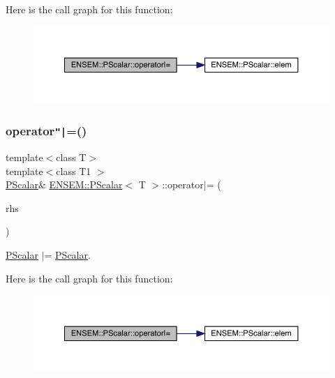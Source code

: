 Here is the call graph for this function\+:
\nopagebreak
\begin{figure}[H]
\begin{center}
\leavevmode
\includegraphics[width=350pt]{d3/d27/classENSEM_1_1PScalar_a59ee3adbb8dabcfb25aae9f9390dcef0_cgraph}
\end{center}
\end{figure}
\mbox{\label{classENSEM_1_1PScalar_a59ee3adbb8dabcfb25aae9f9390dcef0}} 
\subsubsection{\texorpdfstring{operator\texttt{"|}=()}{operator|=()}\hspace{0.1cm}{\footnotesize\ttfamily [3/3]}}
{\footnotesize\ttfamily template$<$class T$>$ \\
template$<$class T1 $>$ \\
\mbox{\hyperlink{classENSEM_1_1PScalar}{P\+Scalar}}\& \mbox{\hyperlink{classENSEM_1_1PScalar}{E\+N\+S\+E\+M\+::\+P\+Scalar}}$<$ T $>$\+::operator$\vert$= (\begin{DoxyParamCaption}\item[{const \mbox{\hyperlink{classENSEM_1_1PScalar}{P\+Scalar}}$<$ T1 $>$ \&}]{rhs }\end{DoxyParamCaption})\hspace{0.3cm}{\ttfamily [inline]}}



\mbox{\hyperlink{classENSEM_1_1PScalar}{P\+Scalar}} $\vert$= \mbox{\hyperlink{classENSEM_1_1PScalar}{P\+Scalar}}. 

Here is the call graph for this function\+:
\nopagebreak
\begin{figure}[H]
\begin{center}
\leavevmode
\includegraphics[width=350pt]{d3/d27/classENSEM_1_1PScalar_a59ee3adbb8dabcfb25aae9f9390dcef0_cgraph}
\end{center}
\end{figure}


